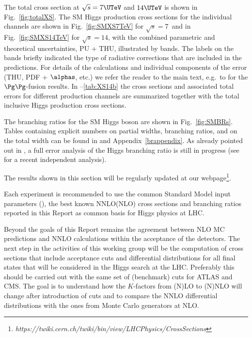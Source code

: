 The total cross section at $\sqrt{s} = 7\UTeV$ and $14\UTeV$ is shown in Fig.~\ref{fig:totalXS}.
The SM Higgs production cross sections for the individual channels are shown in
Fig.~\ref{fig:SMXS7TeV} %
for  $\sqrt{s} = 7$\UTeV\ and in
Fig.~\ref{fig:SMXS14TeV} %
for  $\sqrt{s} = 14$\UTeV, with the combined parametric and theoretical uncertainties,
PU + THU, illustrated by bands. 
The labels on the bands briefly indicated the type of radiative corrections that are
included in the predictions.
For details of the calculations and individual components of the error 
(THU, PDF + $\alphas$, etc.) we refer the reader to the main text, e.g.\
to  for the $\Pg\Pg$-fusion results.
In --\ref{tab:XS14b} the cross sections and associated
total errors for different production channels are summarized
together with the total inclusive Higgs production cross sections. 

The branching ratios for the SM Higgs boson are shown in Fig.~\ref{fig:SMBRs}.
Tables containing explicit numbers on partial widths, branching ratios, and on the 
total width can be found in  and Appendix~\ref{brappendix}.
As already pointed out in \Sref{sec:BR}, a full error analysis of the Higgs branching
ratio is still in progress (see \Bref{Baglio:2010ae} for a recent
independent analysis).

The results shown in this section will be regularly updated at our
webpage\footnote{\sl https://twiki.cern.ch/twiki/bin/view/LHCPhysics/CrossSections}.

Each experiment is recommended to use the common Standard Model input
parameters (\refA{sminput}),
the best known NNLO(NLO) cross sections and branching ratios
reported in this Report as common basis for Higgs physics at LHC.




Beyond the goals of this Report remains the agreement between NLO MC
predictions and NNLO calculations within the acceptance of the detectors.
The next step in the activities of this working group will be the
computation of cross sections that include acceptance cuts and differential
distributions for all final states that will be considered in the Higgs
search at the LHC.
Preferably this should be carried out with the same set of (benchmark) cuts
for ATLAS and CMS.
The goal is to understand how the $K$-factors from (N)LO to (N)NLO will
change after introduction of cuts and to compare the NNLO differential
distributions with the ones from Monte Carlo generators at NLO.

